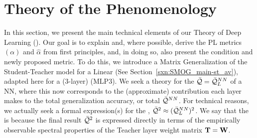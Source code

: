\section{\SemiEmpirical Theory of the \HTSR Phenomenology}
\label{sxn:matgen}

In this section, we present the main technical elements of our \SemiEmpirical Theory of Deep Learning (\SETOL).
Our goal is to explain and, where possible, derive the \HTSR PL metrics \ALPHA $(\alpha)$ and \ALPHAHAT $\hat{\alpha}$
from first principles, and, in doing so, also present the \TRACELOG condition and
newly proposed \WW\DETX metric.
To do this, we introduce a Matrix Generalization of the Student-Teacher model for a Linear \Perceptron
(See Section~\ref{sxn:SMOG_main-st_av}), 
adapted here for a (3-layer) \MultiLayerPerceptron  (MLP3).
We seek a theory for the \LayerQuality $\bar{\mathcal{Q}}=\bar{\mathcal{Q}}^{NN}_{L}$ of a NN, where
this \LayerQuality now corresponds to the (approximate) contribution each layer makes to the total
generalization accuracy, or total \Quality $\bar{\mathcal{Q}}^{NN}$.
For technical reasons, we actually seek a formal expression(s) for the \LayerQualitySquared,
$\bar{\mathcal{Q}}^{2}\approx(\bar{\mathcal{Q}}^{NN}_{L})^2$. 
We say that the \SETOL is \SemiEmpirical because the final result $\bar{\mathcal{Q}}^{2}$ is expressed directly in terms
of the empirically observable spectral properties of the Teacher layer weight matrix ${\mathbf{T}}={\mathbf{W}}$.


%
%
%
%







